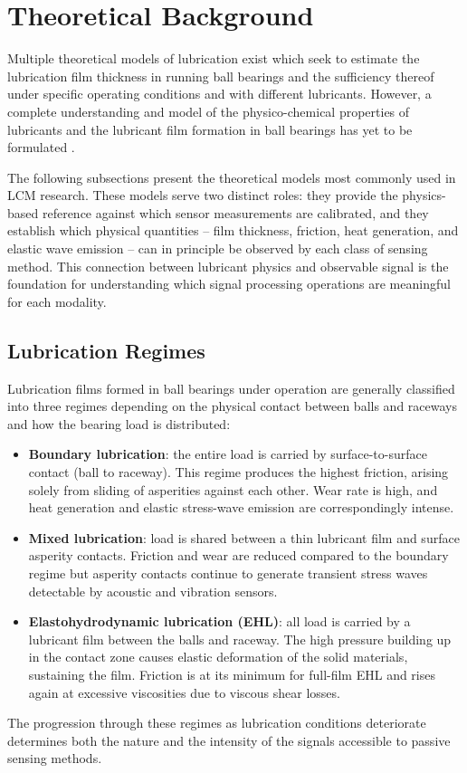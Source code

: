 
\section{Theoretical Background}
\label{sec:theory}

Multiple theoretical models of lubrication exist which seek to estimate the lubrication film thickness in running ball bearings and the sufficiency thereof under specific operating conditions and with different lubricants. However, a complete understanding and model of the physico-chemical properties of lubricants and the lubricant film formation in ball bearings has yet to be formulated \cite{cen_ehl_2021} \cite{dai_situ_2024} \cite{li_lubrication_2026}.

The following subsections present the theoretical models most commonly used in LCM research. These models serve two distinct roles: they provide the physics-based reference against which sensor measurements are calibrated, and they establish which physical quantities -- film thickness, friction, heat generation, and elastic wave emission -- can in principle be observed by each class of sensing method. This connection between lubricant physics and observable signal is the foundation for understanding which signal processing operations are meaningful for each modality.

\subsection{Lubrication Regimes}
\label{subsec:lubrication_regimes}
Lubrication films formed in ball bearings under operation are generally classified into three regimes depending on the physical contact between balls and raceways and how the bearing load is distributed:
\begin{itemize}
    \item \textbf{Boundary lubrication}: the entire load is carried by surface-to-surface contact (ball to raceway). This regime produces the highest friction, arising solely from sliding of asperities against each other. Wear rate is high, and heat generation and elastic stress-wave emission are correspondingly intense.
    \item \textbf{Mixed lubrication}: load is shared between a thin lubricant film and surface asperity contacts. Friction and wear are reduced compared to the boundary regime but asperity contacts continue to generate transient stress waves detectable by acoustic and vibration sensors.
    \item \textbf{Elastohydrodynamic lubrication (EHL)}: all load is carried by a lubricant film between the balls and raceway. The high pressure building up in the contact zone causes elastic deformation of the solid materials, sustaining the film. Friction is at its minimum for full-film EHL and rises again at excessive viscosities due to viscous shear losses.
\end{itemize}
The progression through these regimes as lubrication conditions deteriorate determines both the nature and the intensity of the signals accessible to passive sensing methods.

